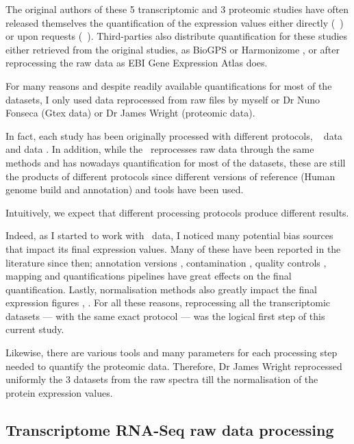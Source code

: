 The original authors of these 5 transcriptomic and 3 proteomic studies have often
released themselves the quantification of the expression values either directly
(\eg\ \cite{Krupp2012}) or upon requests (\eg\ \cite{PandeyData}).
Third-parties also distribute
quantification for these studies either retrieved from the original studies,
as BioGPS \citep{BioGPS1} or Harmonizome \citep{Harmonizome},
or after reprocessing the raw data as EBI Gene Expression Atlas
\citep{EBIgxa} does.

For many reasons and despite readily available quantifications for most of the
datasets, I only used data reprocessed from raw files by myself or Dr Nuno
Fonseca  (Gtex data) or Dr James Wright (proteomic data).

In fact, each study has been originally processed with different protocols,
\eg\ \dataset{\Gtex} data \citep{GTExTranscript} and 
data \citep{Krupp2012}.  In addition, while the \egxa\ reprocesses raw data
through the same methods
and has nowadays quantification for most of the datasets, these are still the
products of different protocols since
different versions of reference (Human genome build and annotation) and tools
have been used.

Intuitively, we expect that different processing protocols produce
different results.

Indeed, as I started to work with \Rnaseq\ data, I noticed many potential bias
sources that impact its final expression values. Many of these have been
reported in the literature since then;
annotation versions \citep{annotationDiff},
contamination \citep{contaminationRNAseq},
quality controls \citep{qualityRNAseq},
mapping and quantifications pipelines \citep{Fonseca2014}
have great effects on the final quantification. Lastly, normalisation
methods also greatly impact the final expression figures
\citep{Dillies2013}, \citep{normalisation2}. For all these reasons, reprocessing
all the transcriptomic datasets --- with the same exact protocol ---
was the logical first step of this current study.

Likewise, there are various tools and many parameters for each processing step
needed to quantify the proteomic data. Therefore, Dr James Wright reprocessed
uniformly the 3 datasets from the raw spectra till the normalisation of the
protein expression values.

\subsection{Transcriptome RNA-Seq raw data processing}

